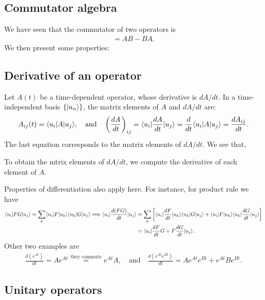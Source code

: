 \subsection{Commutator algebra}
We have seen that the commutator of two operators is 
\begin{align}
    [A,B]=AB-BA.
\end{align}
We then present some properties:
\begin{table}[htbp]
    \centering
\end{table} 
\subsection{Derivative of an operator}
Let $A(t)$ be a time-dependent operator, whose derivative is $dA/dt$. In a time-independent basis $\{|u_n\rangle\}$, the matrix elements of $A$ and $dA/dt$ are:
\begin{align}
    A_{ij}(t)=\langle u_i|A|u_j\rangle,\quad\text{and}\quad\left(\frac{dA}{dt}\right)_{ij}=\langle u_i|\frac{dA}{dt}|u_j\rangle=\frac{d}{dt}\langle u_i|A|u_j\rangle=\frac{dA_{ij}}{dt}.
\end{align}
The last equation corresponds to the matrix elements of $dA/dt$. We see that,
\begin{emphasizer}
    To obtain the mtrix elements of $dA/dt$, we compute the derivative of each element of $A$.
\end{emphasizer}

Properties of differentiation also apply here. For instance, for product rule we have
{\small
\begin{align*}
    \langle u_i|FG|u_j\rangle=\sum_k\langle u_i|F|u_k\rangle\langle u_k|G|u_j\rangle\Longrightarrow\langle u_i|\frac{d(FG)}{dt}|u_j\rangle&=\sum_k\left[\langle u_i|\frac{dF}{dt}|u_k\rangle\langle u_k|G|u_j\rangle+\langle u_i|F|u_k\rangle\langle u_k|\frac{dG}{dt}|u_j\rangle\right]\\
    &=\langle u_i|\frac{dF}{dt}G+F\frac{dG}{dt}|u_j\rangle.
\end{align*}}
Other two examples are
\begin{align*}
    \frac{d(e^{At})}{dt}=Ae^{At}\stackrel{\text{they commute}}{=}e^{At}A,\quad\text{and}\quad\frac{d(e^{At}e^{Bt})}{dt}=Ae^{At}e^{Bt}+e^{At}Be^{Bt}.
\end{align*}

\subsection{Unitary operators}

